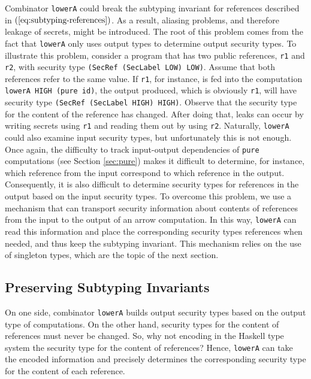\documentclass[times, 10pt,twocolumn]{article}
\begin{document}
Combinator \texttt{lowerA} could break the subtyping invariant for
references described in $(\ref{eq:subtyping-references})$. 
As a result, aliasing
problems, and therefore leakage of secrets, might be introduced.  
The root of this problem comes from the fact that
\texttt{lowerA} only uses output types  
to determine output security types. 
To illustrate this problem, consider a program 
that has two public references, \texttt{r1} and \texttt{r2},
with security type 
\texttt{(SecRef (SecLabel LOW) LOW)}. Assume that both references
refer to the same 
value. If \texttt{r1}, for instance, is fed into the computation 
\texttt{lowerA HIGH (pure id)}, the output produced, which is 
obviously \texttt{r1}, will have security type 
\texttt{(SecRef (SecLabel HIGH) HIGH)}. Observe that the security type 
for the content of the reference has changed. After doing that, leaks can 
occur by writing secrets using \texttt{r1} and reading them out by 
using \texttt{r2}. 
Naturally, \texttt{lowerA} could also examine input 
security types, but 
unfortunately this is not enough. Once again, the 
difficulty to track input-output dependencies of \texttt{pure}
computations (see Section \ref{sec:pure}) makes it difficult to determine, 
for instance,  which reference from the input correspond 
to which reference in the output. Consequently, it 
is also difficult to determine security types for references 
in the output based on the input security types. To overcome 
this problem, we use a mechanism that can
transport security information about contents of references from
the input to the output of an arrow computation. In this way, 
\texttt{lowerA} can read this information and place
the corresponding security types
references when needed, and thus keep the subtyping invariant.
This mechanism relies on the use of singleton
types, which are the topic of the next section.


\subsection{Preserving Subtyping Invariants}

On one side, combinator \texttt{lowerA} builds output security types
based on the output type of computations. 
On the other hand, security types for the content of references must
never be changed. So, why not encoding in the Haskell type system 
the security type for the content of references? 
Hence, \texttt{lowerA} can take
the encoded information and precisely determines the 
corresponding security type for the content of each reference. 
\end{document}
